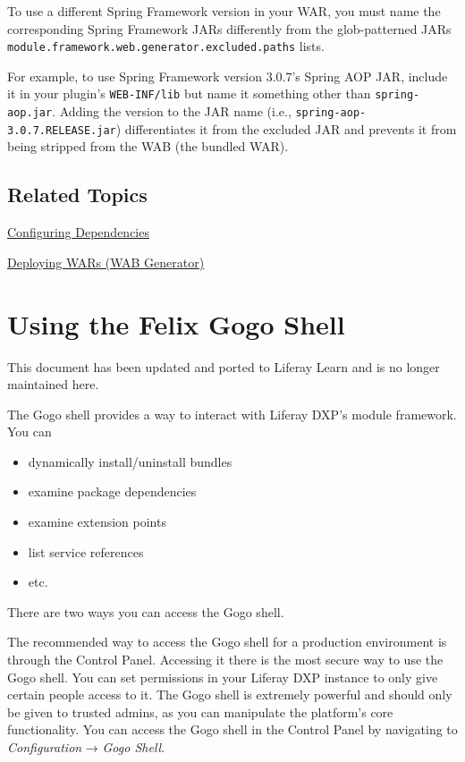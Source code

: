 To use a different Spring Framework version in your WAR, you must name
the corresponding Spring Framework JARs differently from the
glob-patterned JARs
\texttt{module.framework.web.generator.excluded.paths} lists.

For example, to use Spring Framework version 3.0.7's Spring AOP JAR,
include it in your plugin's \texttt{WEB-INF/lib} but name it something
other than \texttt{spring-aop.jar}. Adding the version to the JAR name
(i.e., \texttt{spring-aop-3.0.7.RELEASE.jar}) differentiates it from the
excluded JAR and prevents it from being stripped from the WAB (the
bundled WAR).

\section{Related Topics}\label{related-topics-3}

\href{/docs/7-2/customization/-/knowledge_base/c/configuring-dependencies}{Configuring
Dependencies}

\href{/docs/7-2/customization/-/knowledge_base/c/deploying-wars-wab-generator}{Deploying
WARs (WAB Generator)}

\chapter{Using the Felix Gogo Shell}\label{using-the-felix-gogo-shell}

{ This document has been updated and ported to Liferay Learn and is no
longer maintained here.}

The Gogo shell provides a way to interact with Liferay DXP's module
framework. You can

\begin{itemize}
\tightlist
\item
  dynamically install/uninstall bundles
\item
  examine package dependencies
\item
  examine extension points
\item
  list service references
\item
  etc.
\end{itemize}

There are two ways you can access the Gogo shell.

The recommended way to access the Gogo shell for a production
environment is through the Control Panel. Accessing it there is the most
secure way to use the Gogo shell. You can set permissions in your
Liferay DXP instance to only give certain people access to it. The Gogo
shell is extremely powerful and should only be given to trusted admins,
as you can manipulate the platform's core functionality. You can access
the Gogo shell in the Control Panel by navigating to
\emph{Configuration} → \emph{Gogo Shell}.

